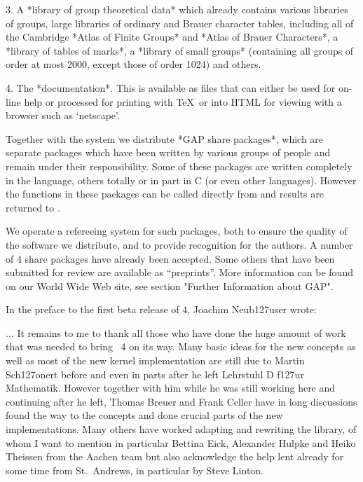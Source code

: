   \item{3.}  
    A *library of group theoretical data* which already contains
    various libraries of groups, large libraries of ordinary and
    Brauer  character tables,   including  all of the   Cambridge *Atlas of
    Finite Groups*  and *Atlas of Brauer Characters*,  a *library of tables
    of marks*, a *library of small groups* (containing  all groups of order
    at most 2000, except those of order 1024) and others.


  \item{4.}
    The *documentation*.  This is available as files that can either be
    used for on-line  help or processed for printing with \TeX\ or into
    HTML for viewing with a browser such as `netscape'.
\endlist

Together  with the system we distribute  *GAP  share packages*, which are
separate packages which have been written by various groups of people and
remain  under their responsibility.  Some  of  these packages are written
completely in the {\GAP}  language, others totally   or in part in  C (or
even  other languages).  However the functions   in these packages can be
called directly from {\GAP} and results are returned to {\GAP}.

We  operate a refereeing  system  for such packages,  both  to ensure the
quality of the software we distribute, and to provide recognition for the
authors.    A  number of  {\GAP}   4  share   packages  have already been
accepted. Some others  that have been submitted  for review are available
as  ``preprints''. More information  can be found on   our World Wide Web
site, see section "Further Information about GAP".


In the preface to the first beta release of {\GAP} 4, Joachim Neub\accent127user wrote:

\begingroup\advance\leftskip 0.5in\advance\rightskip 0.5in

   $\ldots$  It remains to me to  thank all those  who have done the huge
   amount of work that  was needed to  bring  {\GAP}~4 on its  way.  Many
   basic ideas for  the new concepts as  well  as most of the  new kernel
   implementation are still due  to Martin Sch\accent127onert  before and
   even  in parts  after  he left  Lehrstuhl D  f\accent127ur Mathematik.
   However   together with  him  while   he  was still  working  here and
   continuing after he left, Thomas Breuer and  Frank Celler have in long
   discussions found  the way to  the concepts and  done crucial parts of
   the  new  implementations.   Many  others  have  worked  adapting  and
   rewriting the library, of whom I want to mention in particular Bettina
   Eick, Alexander  Hulpke and Heiko  Theissen  from the Aachen  team but
   also   acknowledge   the help  lent   already  for  some  time  from
   St.~Andrews, in particular by Steve Linton.

